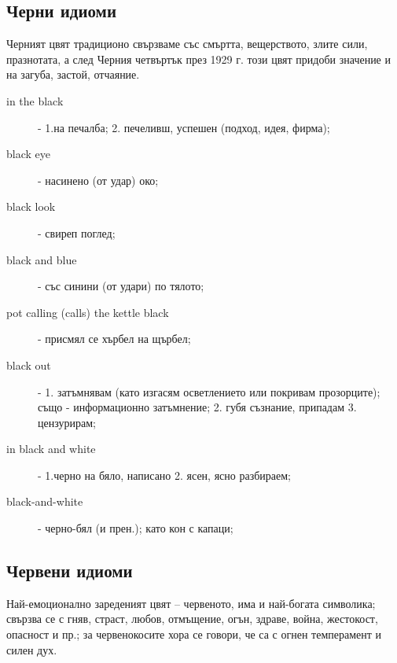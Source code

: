 \subsection{Черни идиоми}
Черният цвят традиционо свързваме със смъртта, вещерството, злите сили, празнотата, а след Черния четвъртък през 1929 г. този цвят придоби значение и на загуба, застой, отчаяние.

\begin{description}
    \item[in the black] - 1.на печалба; 2. печеливш, успешен (подход, идея, фирма);
    \item[black eye] - насинено (от удар) око;
    \item[black look] - свиреп поглед;
    \item[black and blue] - със синини (от удари) по тялото;
    \item[pot calling (calls) the kettle black] - присмял се хърбел на щърбел;
    \item[black out] - 1. затъмнявам (като изгасям осветлението или покривам прозорците); също - информационно затъмнение; 2. губя съзнание, припадам 3. цензурирам;
    \item[in black and white] - 1.черно на бяло, написано 2. ясен, ясно разбираем;
    \item[black-and-white] - черно-бял (и прен.); като кон с капаци;

\end{description}

\subsection{Червени идиоми}
Най-емоционално зареденият цвят – червеното, има и най-богата символика; свързва се с гняв, страст, любов, отмъщение, огън, здраве, война, жестокост, опасност и пр.; за червенокосите хора се говори, че са с огнен темперамент и силен дух.

